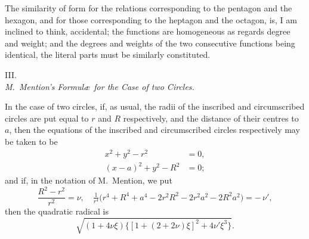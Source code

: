 \documentclass[11pt]{article}
\begin{document}
\medskip

\noindent The similarity of form for the relations corresponding to the pentagon and the hexagon, and for those corresponding to the heptagon and the octagon, is, I am inclined to think, accidental; the functions are homogeneous as regards degree and weight; and the degrees and weights of the two consecutive functions being identical, the literal parts must be similarly constituted.

\medskip

\begin{center}\textsc{III.}\\[0.3em]\textit{M.~Mention's Formul\ae\ for the Case of two Circles.}\end{center}

\medskip

\noindent In the case of two circles, if, as usual, the radii of the inscribed and circumscribed circles are put equal to $r$ and $R$ respectively, and the distance of their centres to $a$, then the equations of the inscribed and circumscribed circles respectively may be taken to be
\[
\begin{aligned}
   x^2 + y^2 - r^2 &= 0,\\
   (x - a)^2 + y^2 - R^2 &= 0;
\end{aligned}
\]
and if, in the notation of M.~Mention, we put
\[
   \frac{R^2 - r^2}{r^2} = \nu,\quad \tfrac{1}{r^4}\bigl(r^4 + R^4 + a^4 - 2 r^2 R^2 - 2 r^2 a^2 - 2 R^2 a^2\bigr) = -\,\nu',
\]
then the quadratic radical is
\[
   \sqrt{(1 + 4\nu\xi)\bigl\{[1 + (2 + 2\nu)\xi]^2 + 4\nu'\xi^3\bigr\}}.
\]
\end{document}
